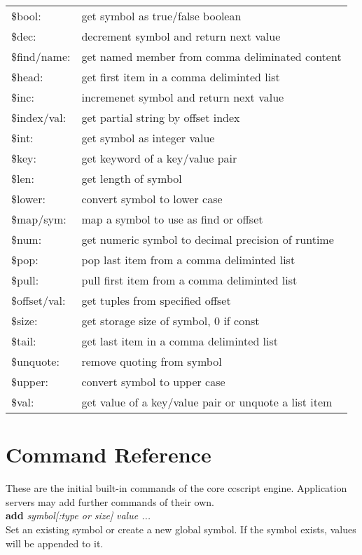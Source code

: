 \documentclass[a4paper,12pt]{article}
\newcommand{\cmdn}[1]{\textbf{#1}}
\newcommand{\cmd}[1]{\cmdn{#1}\index{Command!#1}}
\begin{document}
\begin{tabular}{l l}
\$bool: & get symbol as true/false boolean \\
\$dec: & decrement symbol and return next value \\
\$find/name: & get named member from comma deliminated content \\
\$head: & get first item in a comma deliminted list \\
\$inc: & incremenet symbol and return next value \\
\$index/val: & get partial string by offset index \\
\$int: & get symbol as integer value \\
\$key: & get keyword of a key/value pair \\
\$len: & get length of symbol \\
\$lower: & convert symbol to lower case \\
\$map/sym: & map a symbol to use as find or offset \\
\$num: & get numeric symbol to decimal precision of runtime \\
\$pop: & pop last item from a comma deliminted list \\
\$pull: & pull first item from a comma deliminted list \\
\$offset/val: & get tuples from specified offset \\
\$size: & get storage size of symbol, 0 if const \\
\$tail: & get last item in a comma deliminted list \\
\$unquote: & remove quoting from symbol \\
\$upper: & convert symbol to upper case \\
\$val: & get value of a key/value pair or unquote a list item \\
\end{tabular}

\section{Command Reference}

These are the initial built-in commands of the core ccscript engine.
Application servers may add further commands of their own. \\

\cmd{add} {\it symbol[:type or size]} {\it value ...} \\
	Set an existing symbol or create a new global symbol.  If the symbol
	exists, values will be appended to it.
\end{document}
